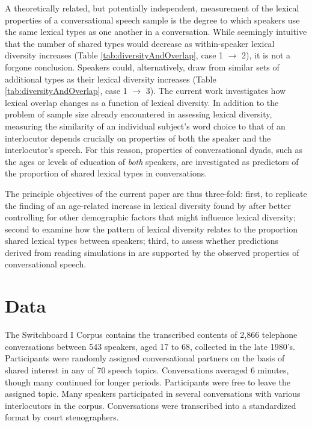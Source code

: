 \documentclass[10pt,letterpaper]{article}
\begin{document}

A theoretically related, but potentially independent, measurement of the lexical properties of a conversational speech sample is the degree to which speakers use the same lexical types as one another in a conversation. While seemingly intuitive that the number of shared types would decrease as within-speaker lexical diversity increases (Table \ref{tab:diversityAndOverlap}, case 1 $\rightarrow$ 2), it is not a forgone conclusion.  Speakers could, alternatively,  draw from similar sets of additional types as their lexical diversity increases  (Table \ref{tab:diversityAndOverlap}, case 1 $\rightarrow$ 3).  The current work investigates how lexical overlap changes as a function of lexical diversity. In addition to the problem of sample size already encountered in assessing lexical diversity, measuring the similarity of an individual subject's word choice to that of an interlocutor depends crucially on properties of both the speaker and the interlocutor's speech. For this reason, properties of conversational dyads, such as the ages or levels of education of \textit{both} speakers, are investigated as predictors of the proportion of shared lexical types in conversations.

The principle objectives of the current paper are thus three-fold: first, to replicate the finding of an age-related increase in lexical diversity found by \citet{hortonEtAl2010} after better controlling for other demographic factors that might influence lexical diversity; second to examine how the pattern of lexical diversity relates to the proportion shared lexical types between speakers; third, to assess whether predictions derived from reading simulations in \citet{ramscarEtAl2014} are supported by the observed properties of conversational speech.

\section{Data}
The Switchboard I Corpus \citep{godfrey1992} contains the transcribed contents of 2,866 telephone conversations between 543 speakers, aged 17 to 68, collected in the late 1980's. Participants were randomly assigned conversational partners on the basis of shared interest in any of 70 speech topics. Conversations averaged 6 minutes, though many continued for longer periods. Participants were free to leave the assigned topic. Many speakers participated in several conversations with various interlocutors in the corpus. Conversations were transcribed into a standardized format by court stenographers. 
\end{document}
